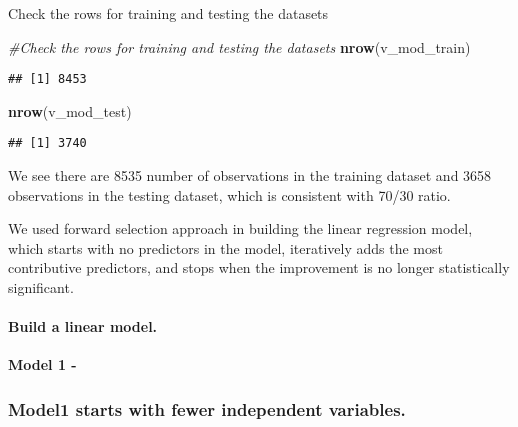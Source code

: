 \documentclass[]{article}
\newenvironment{Shaded}{\begin{snugshade}}{\end{snugshade}}
\newcommand{\KeywordTok}[1]{\textcolor[rgb]{0.13,0.29,0.53}{\textbf{#1}}}
\newcommand{\StringTok}[1]{\textcolor[rgb]{0.31,0.60,0.02}{#1}}
\newcommand{\CommentTok}[1]{\textcolor[rgb]{0.56,0.35,0.01}{\textit{#1}}}
\newcommand{\OperatorTok}[1]{\textcolor[rgb]{0.81,0.36,0.00}{\textbf{#1}}}
\newcommand{\NormalTok}[1]{#1}
\let\oldparagraph\paragraph
\renewcommand{\paragraph}[1]{\oldparagraph{#1}\mbox{}}
\begin{document}
Check the rows for training and testing the datasets

\begin{Shaded}
\begin{Highlighting}[]
\CommentTok{#Check the rows for training and testing the datasets}
\KeywordTok{nrow}\NormalTok{(v_mod_train)}
\end{Highlighting}
\end{Shaded}

\begin{verbatim}
## [1] 8453
\end{verbatim}

\begin{Shaded}
\begin{Highlighting}[]
\KeywordTok{nrow}\NormalTok{(v_mod_test)}
\end{Highlighting}
\end{Shaded}

\begin{verbatim}
## [1] 3740
\end{verbatim}

We see there are 8535 number of observations in the training dataset and
3658 observations in the testing dataset, which is consistent with 70/30
ratio.

We used forward selection approach in building the linear regression
model, which starts with no predictors in the model, iteratively adds
the most contributive predictors, and stops when the improvement is no
longer statistically significant.

\paragraph{Build a linear model.}\label{build-a-linear-model.}

\textbf{Model 1 - }

\subsubsection{Model1 starts with fewer independent
variables.}\label{model1-starts-with-fewer-independent-variables.}

\begin{Shaded}
\end{Shaded}
\end{document}
